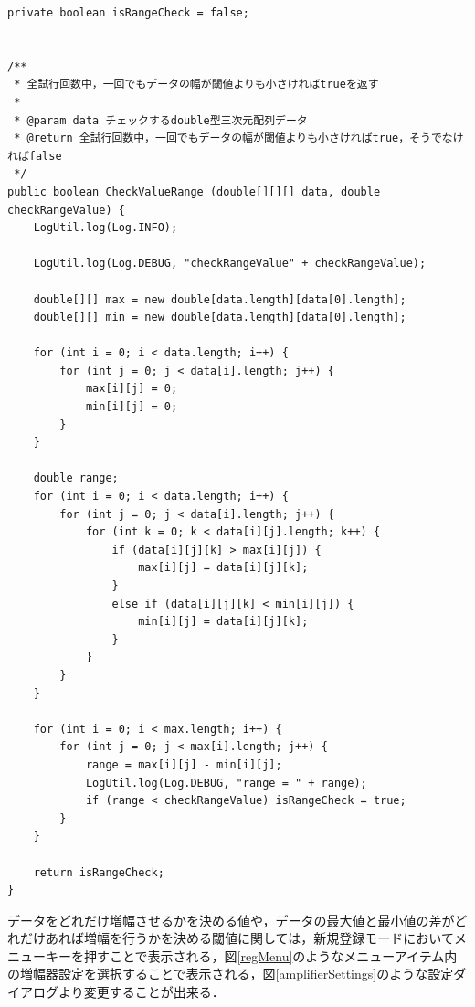 \documentclass[11pt]{jreport}
\begin{document}
        \begin{lstlisting}[caption=データレンジチェック, label=dataRangeCheck]
private boolean isRangeCheck = false;


/**
 * 全試行回数中，一回でもデータの幅が閾値よりも小さければtrueを返す
 *
 * @param data チェックするdouble型三次元配列データ
 * @return 全試行回数中，一回でもデータの幅が閾値よりも小さければtrue，そうでなければfalse
 */
public boolean CheckValueRange (double[][][] data, double checkRangeValue) {
    LogUtil.log(Log.INFO);

    LogUtil.log(Log.DEBUG, "checkRangeValue" + checkRangeValue);

    double[][] max = new double[data.length][data[0].length];
    double[][] min = new double[data.length][data[0].length];

    for (int i = 0; i < data.length; i++) {
        for (int j = 0; j < data[i].length; j++) {
            max[i][j] = 0;
            min[i][j] = 0;
        }
    }

    double range;
    for (int i = 0; i < data.length; i++) {
        for (int j = 0; j < data[i].length; j++) {
            for (int k = 0; k < data[i][j].length; k++) {
                if (data[i][j][k] > max[i][j]) {
                    max[i][j] = data[i][j][k];
                }
                else if (data[i][j][k] < min[i][j]) {
                    min[i][j] = data[i][j][k];
                }
            }
        }
    }

    for (int i = 0; i < max.length; i++) {
        for (int j = 0; j < max[i].length; j++) {
            range = max[i][j] - min[i][j];
            LogUtil.log(Log.DEBUG, "range = " + range);
            if (range < checkRangeValue) isRangeCheck = true;
        }
    }

    return isRangeCheck;
}
        \end{lstlisting}

        データをどれだけ増幅させるかを決める値や，データの最大値と最小値の差がどれだけあれば増幅を行うかを決める閾値に関しては，新規登録モードにおいてメニューキーを押すことで表示される，図\ref{regMenu}のようなメニューアイテム内の増幅器設定を選択することで表示される，図\ref{amplifierSettings}のような設定ダイアログより変更することが出来る．
\end{document}
